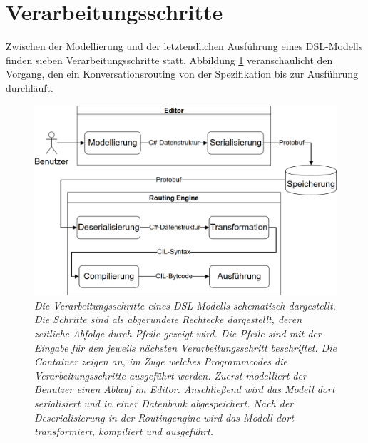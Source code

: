 \newpage

\section{Verarbeitungsschritte}
\label{sec:Verarbeitungsschritte}
Zwischen der Modellierung und der letztendlichen Ausführung eines DSL-Modells finden sieben Verarbeitungsschritte statt. Abbildung \ref{fig:Verarbeitungsschritte} veranschaulicht den Vorgang, den ein Konversationsrouting von der Spezifikation bis zur Ausführung durchläuft.

\begin{figure} %
	\centering
		\includegraphics[width=\textwidth]{img/Verarbeitungsschritte.png}
	\caption[Verarbeitungsschritte eines DSL-Modells]{\textit{Die Verarbeitungsschritte eines DSL-Modells schematisch dargestellt. Die Schritte sind als abgerundete Rechtecke dargestellt, deren zeitliche Abfolge durch Pfeile gezeigt wird. Die Pfeile sind mit der Eingabe für den jeweils nächsten Verarbeitungsschritt beschriftet. Die Container zeigen an, im Zuge welches Programmcodes die Verarbeitungsschritte ausgeführt werden. Zuerst modelliert der Benutzer einen Ablauf im Editor. Anschließend wird das Modell dort serialisiert und in einer Datenbank abgespeichert. Nach der Deserialisierung in der Routingengine wird das Modell dort transformiert, kompiliert und ausgeführt.}}
	\label{fig:Verarbeitungsschritte}
\end{figure}
